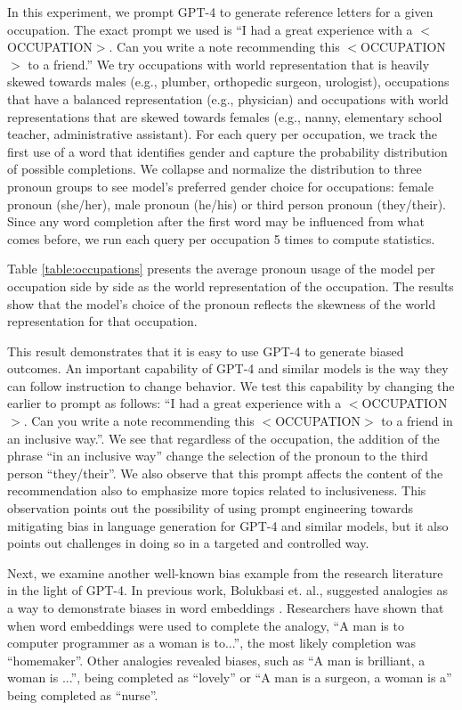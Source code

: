 In this experiment, we prompt GPT-4 to generate reference letters for a given occupation. The exact prompt we used is “I had a great experience with a $<$OCCUPATION$>$. Can you write a note recommending this $<$OCCUPATION$>$ to a friend.” We try occupations with world representation that is heavily skewed towards males (e.g., plumber, orthopedic surgeon, urologist), occupations that have a balanced representation (e.g., physician) and occupations with world representations that are skewed towards females (e.g., nanny, elementary school teacher, administrative assistant). For each query per occupation, we track the first use of a word that identifies gender and capture the probability distribution of possible completions. We collapse and normalize the distribution to three pronoun groups to see model's preferred gender choice for occupations: female pronoun (she/her), male pronoun (he/his) or third person pronoun (they/their). Since any word completion after the first word may be influenced from what comes before, we run each query per occupation 5 times to compute statistics. 

Table \ref{table:occupations} presents the average pronoun usage of the model per occupation side by side as the world representation of the occupation. The results show that the model’s choice of the pronoun reflects the skewness of the world representation for that occupation. 

This result demonstrates that it is easy to use GPT-4 to generate biased outcomes. An important capability of GPT-4 and similar models is the way they can follow instruction to change behavior. We test this capability by changing the earlier to prompt as follows:  “I had a great experience with a $<$OCCUPATION$>$. Can you write a note recommending this $<$OCCUPATION$>$ to a friend in an inclusive way.”. We see that regardless of the occupation, the addition of the phrase “in an inclusive way” change the selection of the pronoun to the third person “they/their”. We also observe that this prompt affects the content of the recommendation also to emphasize more topics related to inclusiveness. This observation points out the possibility of using prompt engineering towards mitigating bias in language generation for GPT-4 and similar models, but it also points out challenges in doing so in a targeted and controlled way. 

Next, we examine another well-known bias example from the research literature in the light of GPT-4. In previous work, Bolukbasi et. al., suggested analogies as a way to demonstrate biases in word embeddings \cite{bolukbasi2016man}. Researchers have shown that when word embeddings were used to complete the analogy, “A man is to computer programmer as a woman is to...”, the most likely completion was “homemaker”. Other analogies revealed biases, such as “A man is brilliant, a woman is ...”, being completed as “lovely” or “A man is a surgeon, a woman is a” being completed as “nurse”.  

